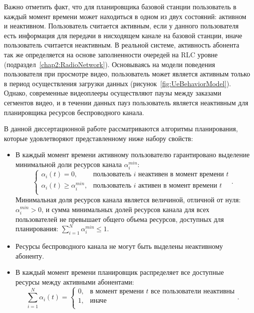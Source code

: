 Важно отметить факт, что для планировщика базовой станции пользователь в каждый момент времени может находиться в одном из двух состояний: активном и неактивном. Пользователь считается активным, если у данного пользователя есть информация для передачи в нисходящем канале на базовой станции, иначе пользователь считается неактивным. В реальной системе, активность абонента так же определяется на основе заполненности очередей на RLC уровне (подраздел~\ref{chap2:RadioNetwork}). Основываясь на модели поведения пользователя при просмотре видео, пользователь может является активным только в период осуществления загрузки данных (рисунок~\ref{fig:UeBehaviorModel}). Однако, современные видеоплееры осуществляют паузы между заказами сегментов видео, и в течении данных пауз пользователь является неактивным для планировщика ресурсов беспроводного канала.

В данной диссертационной работе рассматриваются алгоритмы планирования, которые удовлетворяют представленному ниже набору свойств:
\begin{itemize}
	\item В каждый момент времени активному пользователю гарантировано выделение минимальной доли ресурсов канала $\alpha_{i}^{min}$:
	\begin{equation}
		\nonumber
		\begin{cases}
			\alpha_i(t) = 0, & \text{пользователь $i$ неактивен в момент времени $t$} \\
			\alpha_i(t) \geq \alpha_{i}^{min}, & \text{пользователь $i$ активен в момент времени $t$}\\
		\end{cases}.
	\end{equation}
	Минимальная доля ресурсов канала является величиной, отличной от нуля: $\alpha_{i}^{min} > 0$, и сумма минимальных долей ресурсов канала для всех пользователей не превышает общего объема ресурсов, доступных для планирования: $\sum\limits_{i=1}^{N}\alpha_{i}^{min} \leq 1$.
	\item Ресурсы беспроводного канала не могут быть выделены неактивному абоненту.
	\item В каждый момент времени планировщик распределяет все доступные ресурсы между активными абонентами:
	\begin{equation}
		\sum\limits_{i=1}^{N}\alpha_{i}(t) =
		\begin{cases}
			0, & \text{в момент времени $t$ все пользователи неактивны} \\
			1, & \text{иначе}\\
		\end{cases}.
	\end{equation}
\end{itemize}

